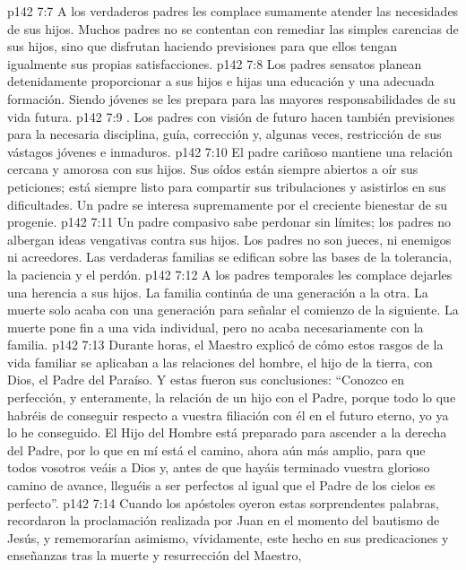 \vs p142 7:7  A los verdaderos padres les complace sumamente atender las necesidades de sus hijos. Muchos padres no se contentan con remediar las simples carencias de sus hijos, sino que disfrutan haciendo previsiones para que ellos tengan igualmente sus propias satisfacciones.
\vs p142 7:8  Los padres sensatos planean detenidamente proporcionar a sus hijos e hijas una educación y una adecuada formación. Siendo jóvenes se les prepara para las mayores responsabilidades de su vida futura.
\vs p142 7:9 . Los padres con visión de futuro hacen también previsiones para la necesaria disciplina, guía, corrección y, algunas veces, restricción de sus vástagos jóvenes e inmaduros.
\vs p142 7:10  El padre cariñoso mantiene una relación cercana y amorosa con sus hijos. Sus oídos están siempre abiertos a oír sus peticiones; está siempre listo para compartir sus tribulaciones y asistirlos en sus dificultades. Un padre se interesa supremamente por el creciente bienestar de su progenie.
\vs p142 7:11  Un padre compasivo sabe perdonar sin límites; los padres no albergan ideas vengativas contra sus hijos. Los padres no son jueces, ni enemigos ni acreedores. Las verdaderas familias se edifican sobre las bases de la tolerancia, la paciencia y el perdón.
\vs p142 7:12  A los padres temporales les complace dejarles una herencia a sus hijos. La familia continúa de una generación a la otra. La muerte solo acaba con una generación para señalar el comienzo de la siguiente. La muerte pone fin a una vida individual, pero no acaba necesariamente con la familia.
\vs p142 7:13 \pc Durante horas, el Maestro explicó de cómo estos rasgos de la vida familiar se aplicaban a las relaciones del hombre, el hijo de la tierra, con Dios, el Padre del Paraíso. Y estas fueron sus conclusiones: “Conozco en perfección, y enteramente, la relación de un hijo con el Padre, porque todo lo que habréis de conseguir respecto a vuestra filiación con él en el futuro eterno, yo ya lo he conseguido. El Hijo del Hombre está preparado para ascender a la derecha del Padre, por lo que en mí está el camino, ahora aún más amplio, para que todos vosotros veáis a Dios y, antes de que hayáis terminado vuestra glorioso camino de avance, lleguéis a ser perfectos al igual que el Padre de los cielos es perfecto”.
\vs p142 7:14 Cuando los apóstoles oyeron estas sorprendentes palabras, recordaron la proclamación realizada por Juan en el momento del bautismo de Jesús, y rememorarían asimismo, vívidamente, este hecho en sus predicaciones y enseñanzas tras la muerte y resurrección del Maestro,
